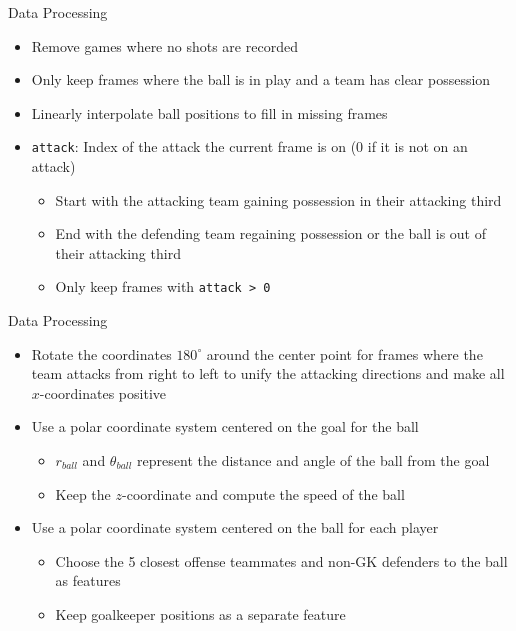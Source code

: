 \documentclass[
  11pt,
  ignorenonframetext,
]{beamer}
\providecommand{\tightlist}{%
  \setlength{\itemsep}{0pt}\setlength{\parskip}{0pt}}
\begin{document}
\begin{frame}[fragile]{Data Processing}
\protect{}\label{data-processing}
\begin{itemize}
\tightlist
\item
  Remove games where no shots are recorded
\item
  Only keep frames where the ball is in play and a team has clear
  possession
\item
  Linearly interpolate ball positions to fill in missing frames
\item
  \texttt{attack}: Index of the attack the current frame is on (0 if it
  is not on an attack)

  \begin{itemize}
  \tightlist
  \item
    Start with the attacking team gaining possession in their attacking
    third
  \item
    End with the defending team regaining possession or the ball is out
    of their attacking third
  \item
    Only keep frames with \texttt{attack\ \textgreater{}\ 0}
  \end{itemize}
\end{itemize}
\end{frame}

\begin{frame}{Data Processing}
\protect{}\label{data-processing-1}
\begin{itemize}
\tightlist
\item
  Rotate the coordinates \(180^\circ\) around the center point for
  frames where the team attacks from right to left to unify the
  attacking directions and make all \(x\)-coordinates positive
\item
  Use a polar coordinate system centered on the goal for the ball

  \begin{itemize}
  \tightlist
  \item
    \(r_{ball}\) and \(\theta_{ball}\) represent the distance and angle
    of the ball from the goal
  \item
    Keep the \(z\)-coordinate and compute the speed of the ball
  \end{itemize}
\item
  Use a polar coordinate system centered on the ball for each player

  \begin{itemize}
  \tightlist
  \item
    Choose the 5 closest offense teammates and non-GK defenders to the
    ball as features
  \item
    Keep goalkeeper positions as a separate feature
  \end{itemize}
\end{itemize}
\end{frame}
\end{document}
